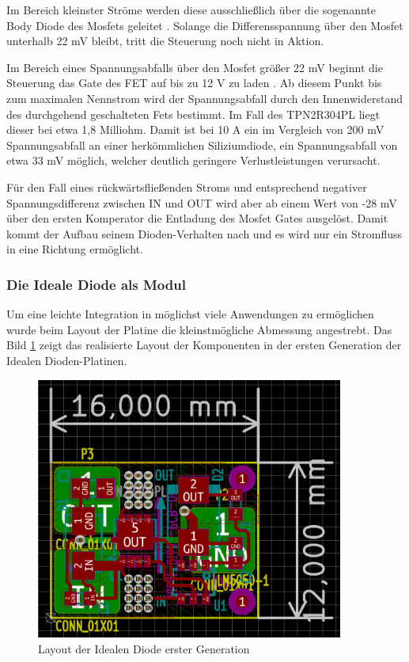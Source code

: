 Im Bereich kleinster Ströme werden diese ausschließlich über die sogenannte Body Diode des Mosfets geleitet \cite{Herberg2013}. Solange die Differensspannung über den Mosfet unterhalb 22 mV bleibt, tritt die Steuerung noch nicht in Aktion.

Im Bereich eines Spannungsabfalls über den Mosfet größer 22 mV beginnt die Steuerung das Gate des FET auf bis zu 12 V zu laden \cite{LM5050-1}. Ab diesem Punkt bis zum maximalen Nennstrom wird der Spannungsabfall durch den Innenwiderstand des durchgehend geschalteten Fets bestimmt. Im Fall des TPN2R304PL liegt dieser bei etwa 1,8 Milliohm. Damit ist bei 10 A ein im Vergleich von 200 mV Spannungsabfall an einer herkömmlichen Siliziumdiode, ein Spannungsabfall von etwa 33 mV möglich, welcher deutlich geringere Verlustleistungen verursacht.

Für den Fall eines rückwärtsfließenden Stroms und entsprechend negativer Spannungsdifferenz zwischen IN und OUT wird aber ab einem Wert von -28 mV über den ersten Komperator die Entladung des Mosfet Gates ausgelöst. Damit kommt der Aufbau seinem Dioden-Verhalten nach und es wird nur ein Stromfluss in eine Richtung ermöglicht.

\subsubsection{Die Ideale Diode als Modul}

Um eine leichte Integration in möglichst viele Anwendungen zu ermöglichen wurde beim Layout der Platine die kleinstmögliche Abmessung angestrebt. 
Das Bild \ref{fig:Layout der Idealen Diode erster Generation} zeigt das realisierte Layout der Komponenten in der ersten Generation der Idealen Dioden-Platinen.

\begin{figure}[H]
\centering
\includegraphics[width=0.9\textwidth]{bilder/Ideale_Diode/Ideale_Diode_Mini_rev01_ver00.png} 
\caption{Layout der Idealen Diode erster Generation} 
\label{fig:Layout der Idealen Diode erster Generation}
\end{figure}

